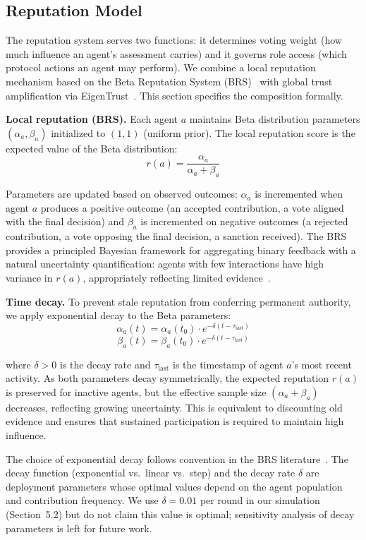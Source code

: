 \documentclass[11pt]{article}
\begin{document}
\subsection{Reputation Model}

The reputation system serves two functions: it determines voting weight (how much influence an agent's assessment carries) and it governs role access (which protocol actions an agent may perform). We combine a local reputation mechanism based on the Beta Reputation System (BRS)~\cite{josang2002} with global trust amplification via EigenTrust~\cite{kamvar2003}. This section specifies the composition formally.

\textbf{Local reputation (BRS).} Each agent $a$ maintains Beta distribution parameters $(\alpha_a, \beta_a)$ initialized to $(1, 1)$ (uniform prior). The local reputation score is the expected value of the Beta distribution:
\[
r(a) = \frac{\alpha_a}{\alpha_a + \beta_a}
\]

Parameters are updated based on observed outcomes: $\alpha_a$ is incremented when agent $a$ produces a positive outcome (an accepted contribution, a vote aligned with the final decision) and $\beta_a$ is incremented on negative outcomes (a rejected contribution, a vote opposing the final decision, a sanction received). The BRS provides a principled Bayesian framework for aggregating binary feedback with a natural uncertainty quantification: agents with few interactions have high variance in $r(a)$, appropriately reflecting limited evidence~\cite{josang2002}.

\textbf{Time decay.} To prevent stale reputation from conferring permanent authority, we apply exponential decay to the Beta parameters:
\[
\alpha_a(t) = \alpha_a(t_0) \cdot e^{-\delta(t - \tau_{\text{last}})}
\]
\[
\beta_a(t) = \beta_a(t_0) \cdot e^{-\delta(t - \tau_{\text{last}})}
\]

where $\delta > 0$ is the decay rate and $\tau_{\text{last}}$ is the timestamp of agent $a$'s most recent activity. As both parameters decay symmetrically, the expected reputation $r(a)$ is preserved for inactive agents, but the effective sample size $(\alpha_a + \beta_a)$ decreases, reflecting growing uncertainty. This is equivalent to discounting old evidence and ensures that sustained participation is required to maintain high influence.

The choice of exponential decay follows convention in the BRS literature~\cite{josang2002}. The decay function (exponential vs.\ linear vs.\ step) and the decay rate $\delta$ are deployment parameters whose optimal values depend on the agent population and contribution frequency. We use $\delta = 0.01$ per round in our simulation (Section~5.2) but do not claim this value is optimal; sensitivity analysis of decay parameters is left for future work.
\end{document}
